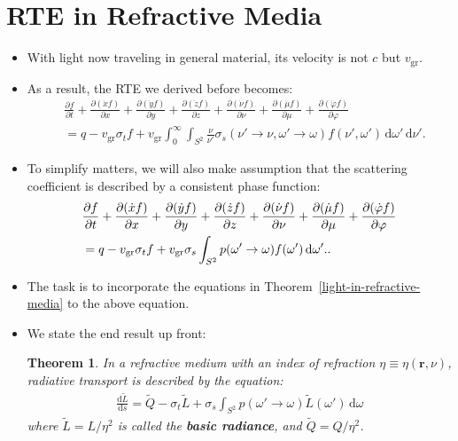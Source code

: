 \documentclass[10pt]{article}
\newtheorem{theorem}[lemma]{Theorem}
\newcommand{\dee}{\mathrm{d}}
\newcommand{\ve}[1]{\mathbf{#1}}
\newcommand{\ra}{\rightarrow}
\newcommand{\group}{\mathrm{gr}}
\begin{document}
  \section{RTE in Refractive Media}
  \begin{itemize}
    \item With light now traveling in general material, its velocity is not $c$ but $v_\group$. 

    \item As a result, the RTE we derived before becomes:
    \begin{align*}
      & \frac{\partial f}{\partial t}  
      + \frac{\partial (\dot x f)}{\partial x}
      + \frac{\partial (\dot y f)}{\partial y}
      + \frac{\partial (\dot z f)}{\partial z}
      + \frac{\partial (\dot \nu f)}{\partial \nu}
      + \frac{\partial (\dot \mu f)}{\partial \mu}
      + \frac{\partial (\dot \varphi f)}{\partial \varphi} \\
      &= q -v_\group \sigma_t f
      +v_\group \int_{0}^\infty \int_{S^2} \frac{\nu}{\nu'} \sigma_s(\nu' \ra \nu, \omega' \ra \omega) f(\nu', \omega')\, \dee \omega'\, \dee \nu'.
    \end{align*}

    \item To simplify matters, we will also make assumption that the scattering coefficient is described by a consistent phase function:
    \begin{align}
      & \frac{\partial f}{\partial t}  
      + \frac{\partial (\dot x f)}{\partial x}
      + \frac{\partial (\dot y f)}{\partial y}
      + \frac{\partial (\dot z f)}{\partial z}
      + \frac{\partial (\dot \nu f)}{\partial \nu}
      + \frac{\partial (\dot \mu f)}{\partial \mu}
      + \frac{\partial (\dot \varphi f)}{\partial \varphi} \notag \\
      &= q -v_\group \sigma_t f 
      +v_\group \sigma_s \int_{S^2} p(\omega' \ra \omega) f(\omega')\, \dee \omega'. \label{basic-rte-vgroup}.
    \end{align}    

    \item The task is to incorporate the equations in Theorem~\ref{light-in-refractive-media} to the above equation.

    \item We state the end result up front:
    \begin{theorem} \label{rrte}
      In a refractive medium with an index of refraction $\eta \equiv \eta(\ve{r}, \nu)$, radiative transport is described by the equation:
      \begin{align*}
        \frac{\dee \tilde L}{\dee s} = \tilde Q - \sigma_t \tilde L + \sigma_s \int_{S^2} p(\omega' \ra \omega) \tilde L(\omega')\, \dee \omega
      \end{align*}
      where $\tilde L = L / \eta^2$ is called the \textbf{basic radiance}, and $\tilde Q = Q / \eta^2$.
    \end{theorem}


\end{itemize}
\end{document}
